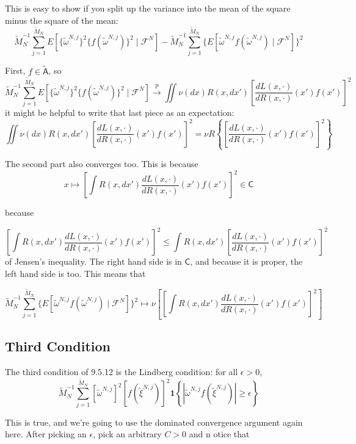 \documentclass{article}
\begin{document}
This is easy to show if you split up the variance into the mean of the square minus the square of the mean:
$$
\tilde{M}_N^{-1}\sum_{j=1}^{\tilde{M}_N} E\left[  \{\tilde{\omega}^{N,j}\}^2 \{f(\tilde{\omega}^{N,j})\}^2  \mid \mathcal{F}^N \right] - \tilde{M}_N^{-1}\sum_{j=1}^{\tilde{M}_N} \{E\left[  \tilde{\omega}^{N,j} f(\tilde{\omega}^{N,j})  \mid \mathcal{F}^N \right]\}^2
$$

First, $f \in \tilde{\mathsf{A}}$, so 
$$
\tilde{M}_N^{-1}\sum_{j=1}^{\tilde{M}_N} E\left[  \{\tilde{\omega}^{N,j}\}^2 \{f(\tilde{\omega}^{N,j})\}^2  \mid \mathcal{F}^N \right] \overset{\text{p}}{\to}
\iint \nu(dx) R(x,dx')\left[ \frac{dL(x,\cdot)}{dR(x,\cdot)}(x') f(x') \right]^2
$$
it might be helpful to write that last piece as an expectation:
$$
\iint \nu(dx) R(x,dx')\left[ \frac{dL(x,\cdot)}{dR(x,\cdot)}(x') f(x') \right]^2
=
\nu R\left\{ \left[ \frac{dL(x,\cdot)}{dR(x,\cdot)}(x') f(x') \right]^2 \right\}
$$

The second part also converges too. This is because 
$$
x \mapsto \left[ \int R(x,dx') \frac{dL(x,\cdot)}{dR(x,\cdot)}(x') f(x') \right]^2 \in \mathsf{C}
$$

because

$$
\left[ \int R(x,dx') \frac{dL(x,\cdot)}{dR(x,\cdot)}(x') f(x') \right]^2 \le \int R(x,dx')\left[ \frac{dL(x,\cdot)}{dR(x,\cdot)}(x') f(x') \right]^2
$$
of Jensen's inequality. The right hand side is in $\mathsf{C}$, and because it is proper, the left hand side is too. This means that 

$$
\tilde{M}_N^{-1}\sum_{j=1}^{\tilde{M}_N} \{E\left[  \tilde{\omega}^{N,j} f(\tilde{\omega}^{N,j})  \mid \mathcal{F}^N \right]\}^2 \mapsto \nu\left[ \left[ \int R(x,dx') \frac{dL(x,\cdot)}{dR(x,\cdot)}(x') f(x') \right]^2  \right]
$$


\subsection{Third Condition}


The third condition of 9.5.12 is the Lindberg condition: for all $\epsilon > 0$,
$$
\tilde{M}_N^{-1} \sum_{j=1}^{\tilde{M}_N} [\tilde{\omega}^{N,j}]^2 [f(\tilde{\xi}^{N,j})]^2 \mathbf{1}\left\{ |\tilde{\omega}^{N,j} f(\tilde{\xi}^{N,j}) | \ge \epsilon   \right\}
$$



This is true, and we're going to use the dominated convergence argument again here. After picking an $\epsilon$, pick an arbitrary $C > 0$ and n  otice that
\end{document}
